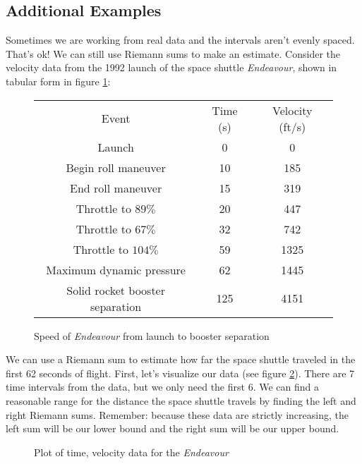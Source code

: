 \subsection{Additional Examples}
Sometimes we are working from real data and the intervals aren't evenly spaced. That's ok! We can still use Riemann sums to make an estimate. Consider the velocity data from the 1992 launch of the space shuttle \textit{Endeavour}, shown in tabular form in figure \ref{fig:endeavourdata}:

\begin{figure}
	\centering
	\begin{tabular}{c|c|c}
	Event & Time (s) & Velocity (ft/s) \\
	Launch & 0 & 0 \\
	Begin roll maneuver & 10 & 185 \\
	End roll maneuver & 15 & 319 \\
	Throttle to $89\%$ & 20 & 447 \\
	Throttle to $67\%$ & 32 & 742 \\
	Throttle to $104\%$ & 59 & 1325 \\
	Maximum dynamic pressure & 62 & 1445 \\
	Solid rocket booster separation & 125 & 4151 \\
	\end{tabular}
	\caption{Speed of \textit{Endeavour} from launch to booster separation}
	\label{fig:endeavourdata}
\end{figure}

We can use a Riemann sum to estimate how far the space shuttle traveled in the first 62 seconds of flight. First, let's visualize our data (see figure \ref{fig:endeavourscatter}). There are 7 time intervals from the data, but we only need the first 6. We can find a reasonable range for the distance the space shuttle travels by finding the left and right Riemann sums. Remember: because these data are strictly increasing, the left sum will be our lower bound and the right sum will be our upper bound. 

\begin{figure}
	\centering
	\caption{Plot of time, velocity data for the \textit{Endeavour}}
	\label{fig:endeavourscatter}
\end{figure}

